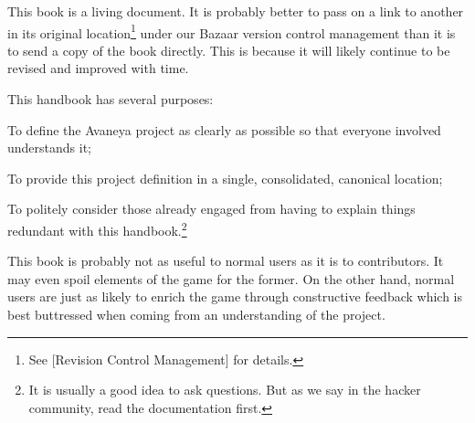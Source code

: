 

This book is a living document. It is probably better to pass on a link to another in its original location\footnote[]{See [Revision Control Management] for details.} under our Bazaar version control management than it is to send a copy of the book directly. This is because it will likely continue to be revised and improved with time.

This handbook has several purposes:

\startitemize[n]
\item
To define the Avaneya project as clearly as possible so that everyone involved understands it;

\item
To provide this project definition in a single, consolidated, canonical location;

\item
To politely consider those already engaged from having to explain things redundant with this handbook.\footnote[rtfm]{It is usually a good idea to ask questions. But as we say in the hacker community, read the documentation first.}
\stopitemize

This book is probably not as useful to normal users as it is to contributors. It may even spoil elements of the game for the former. On the other hand, normal users are just as likely to enrich the game through constructive feedback which is best buttressed when coming from an understanding of the project.

